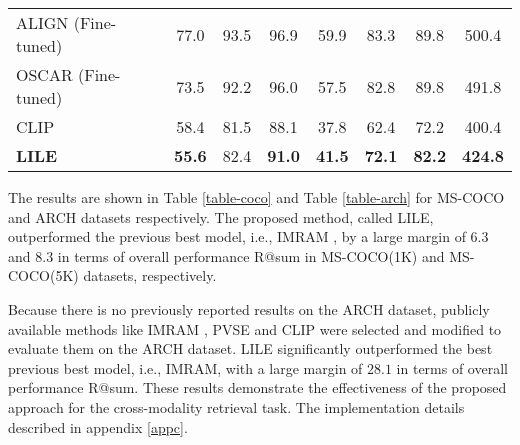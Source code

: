\documentclass{midl}
\begin{document}
\begin{table}[!h]
{\begin{tabular}{@{}lccccccc@{}}
\midrule
ALIGN (Fine-tuned) \cite{jia2021scaling} &77.0 & 93.5 & 96.9 & 59.9 & 83.3 & 89.8 & 500.4 \\
OSCAR (Fine-tuned)\cite{li2020oscar}   & 73.5 & 92.2 & 96.0 & 57.5 & 82.8 & 89.8 & 491.8 \\
CLIP\cite{radford2021learning}         & 58.4 & 81.5 & 88.1 & 37.8 & 62.4 & 72.2 & 400.4 \\ \midrule
\textbf{LILE}                                                    & \textbf{55.6}     &    82.4  & \textbf{91.0}     & \textbf{41.5}     & \textbf{72.1}     &    \textbf{82.2}  &     \textbf{424.8}  \\ \bottomrule
\end{tabular}}
\end{table}


\begin{table*}[ht!]
\centering
\caption{Comparison with previous methods using the ARCH dataset}
\label{table-arch}
\end{table*}
The results are shown in Table \ref{table-coco} and Table \ref{table-arch} for MS-COCO and ARCH datasets respectively. The proposed method, called LILE, outperformed the previous best model, i.e., IMRAM \cite{chen2020imram}, by a large margin of $6.3$ and $8.3$ in terms of overall performance R@sum in MS-COCO(1K) and MS-COCO(5K) datasets,  respectively. 

Because there is no previously reported results on the ARCH dataset, publicly available methods like IMRAM \cite{chen2020imram}, PVSE \cite{song2019polysemous} and CLIP \cite{radford2021learning} were selected and modified to evaluate them on the ARCH dataset. LILE significantly outperformed the best previous best model, i.e., IMRAM, with a large margin of $28.1$ in terms of overall performance R@sum. These results demonstrate the effectiveness of the proposed approach for the cross-modality retrieval task. The implementation details described in appendix \ref{appc}.
\end{document}
